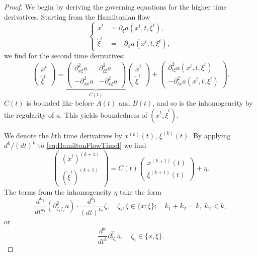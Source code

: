 \documentclass{amsart}
\theoremstyle{definition}
\begin{document}
\begin{proof}
We begin by deriving the governing equations for the higher time derivatives. Starting from the Hamiltonian flow
\begin{equation}
\label{eq:HamiltonFlowTimeDerivatives}
\left\{ \begin{array}{cl}
\dot{x}^t &= \partial_{\xi} a(x^t,t,\xi^t), \\
\dot{\xi}^t &= - \partial_x a(x^t,t,\xi^t),
\end{array} \right.
\end{equation}
we find for the second time derivatives:
\begin{equation}
\label{eq:HamiltonFlowTimeI}
\begin{pmatrix}
\ddot{x}^t \\
\ddot{\xi}^t
\end{pmatrix}
=
\underbrace{\begin{pmatrix}
\partial^2_{x \xi} a & \partial^2_{\xi \xi} a \\
- \partial^2_{x x} a & - \partial^2_{x \xi} a
\end{pmatrix}}_{C(t)}
\begin{pmatrix}
\dot{x}^t \\ \dot{\xi}^t
\end{pmatrix}
+
\begin{pmatrix}
\partial^2_{t \xi} a(x^t,t,\xi^t) \\
- \partial^2_{t x} a(x^t,t,\xi^t)
\end{pmatrix}
.
\end{equation}
$C(t)$ is bounded like before $A(t)$ and $B(t)$, and so is the inhomogeneity by the regularity of $a$. This yields boundedness of $(\dot{x}^t,\dot{\xi}^t)$.

We denote the $k$th time derivatives by $x^{(k)}(t)$, $\xi^{(k)}(t)$. By applying $d^k / (dt)^k$ to \eqref{eq:HamiltonFlowTimeI} we find
\begin{equation}
\label{eq:HamiltonFlowHigherOrderTimeDerivative}
\begin{pmatrix}
(\dot{x}^t)^{(k+1)} \\ (\dot{\xi}^t)^{(k+1)}
\end{pmatrix}
= C(t)
\begin{pmatrix}
x^{(k+1)}(t) \\ \xi^{(k+1)}(t)
\end{pmatrix}
+ \eta.
\end{equation}
The terms from the inhomogeneity $\eta$ take the form
\begin{equation*}
\frac{d^{k_1}}{dt^{k_1}} (\partial^2_{\zeta_1 \zeta_2} a ) \cdot \frac{d^{k_2}}{(dt)^{k_2}} \dot{\zeta}, \quad \zeta_i, \zeta \in \{ x ; \xi \}; \quad k_1 + k_2 = k, \; k_2 < k,
\end{equation*}
or
\begin{equation*}
\frac{d^k}{dt^k} \partial^2_{t \zeta_i} a, \quad \zeta_i \in \{x,\xi\}.
\end{equation*}


\end{proof}
\end{document}
